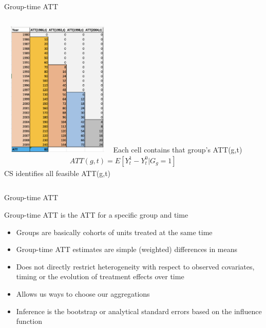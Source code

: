 \documentclass{beamer}
\begin{document}
\begin{frame}{Group-time ATT}
       \begin{columns}
             \centering
             \includegraphics[height=6.5cm, width=5.5cm]{./lecture_includes/baker_attgt}
            Each cell contains that group's ATT(g,t)
\begin{eqnarray*}
ATT(g,t) = E[Y_t^1 - Y_t^0 | G_g=1]
\end{eqnarray*}CS identifies all feasible ATT(g,t)
         \end{columns} 
    \end{frame}




\begin{frame}{Group-time ATT}

Group-time ATT is the ATT for a specific group and time
\begin{itemize}
\item Groups are basically cohorts of units treated at the same time
\item Group-time ATT estimates are simple (weighted) differences in means
\item Does not directly restrict heterogeneity with respect to observed covariates, timing or the evolution of treatment effects over time
\item Allows us ways to choose our aggregations
\item Inference is the bootstrap or analytical standard errors based on the influence function
\end{itemize}

\end{frame}
\end{document}
